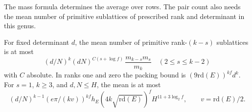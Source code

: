 The mass formula determines the average over rows. The pair count also needs the mean number of primitive sublattices of prescribed rank and determinant in this genus.

\begin{proposition}\label{prop:primitive-flag-means}
For fixed determinant \(d\), the mean number of primitive
rank-\((k-s)\) sublattices is at most
\[
 (d/N)^k(dN)^{C(s+\log f)}\,\frac{m_{k-s}m_s}{m_k}
 \quad(2\le s\le k-2)
\]
with \(C\) absolute. In ranks one and zero the packing
bound is \((9\mathrm{rd}(E))^{kf}d^k\).
For \(s=1\), \(k\ge3\), and \(d,N\le H\), the mean is at most
\[
 (d/N)^{k-1}(e\pi/(kv))^{kf}h_E
 (4k\sqrt{\mathrm{rd}(E)})^f H^{11+3\log_2 f},
 \qquad v=\mathrm{rd}(E)/2 .
\]
\end{proposition}

